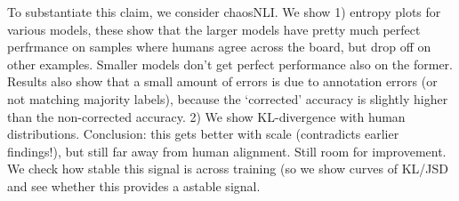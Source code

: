 To substantiate this claim, we consider chaosNLI.
We show 1) entropy plots for various models, these show that the larger models have pretty much perfect perfrmance on samples where humans agree across the board, but drop off on other examples. Smaller models don't get perfect performance also on the former. Results also show that a small amount of errors is due to annotation errors (or not matching majority labels), because the `corrected' accuracy is slightly higher than the non-corrected accuracy.
2) We show KL-divergence with human distributions. Conclusion: this gets better with scale (contradicts earlier findings!), but still far away from human alignment. Still room for improvement. We check how stable this signal is across training (so we show curves of KL/JSD and see whether this provides a astable signal.


